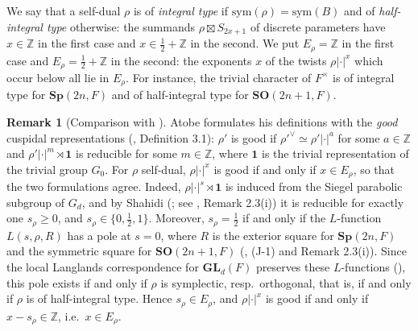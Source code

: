 \documentclass[a4paper,12pt,leqno]{amsart}
\theoremstyle{plain}
\theoremstyle{definition}
\newtheorem{rmk}[thm]{Remark}
\providecommand{\bbZ}{\mathbb{Z}}\providecommand{\bbC}{\mathbb{C}}\providecommand{\Id}{\mathrm{Id}}\providecommand{\Irr}{\mathbf{Irr}}\providecommand{\Alg}{\mathrm{Alg}}
\begin{document}
We say that a self-dual $\rho$ is of \emph{integral type} if $\mathrm{sym}(\rho)=\mathrm{sym}(B)$ and of
\emph{half-integral type} otherwise: the summands $\rho\boxtimes S_{2x+1}$ of discrete parameters have
$x\in\bbZ$ in the first case and $x\in\frac12+\bbZ$ in the second. We put $E_\rho=\bbZ$ in the first case and $E_\rho=\frac12+\bbZ$
in the second: the exponents $x$ of the twists $\rho|\cdot|^x$ which occur below all lie in $E_\rho$. For instance, the trivial character of
$F^\times$ is of integral type for $\mathbf{Sp}(2n,F)$ and of half-integral type for
$\mathbf{SO}(2n+1,F)$.

\begin{rmk}[Comparison with \cite{Ato24}]\label{rmk:good} Atobe formulates his definitions with the
\emph{good} cuspidal representations (\cite{Ato24}, Definition 3.1): $\rho'$ is good if
$\rho'^\vee\simeq\rho'|\cdot|^a$ for some $a\in\bbZ$ and $\rho'|\cdot|^m\rtimes\mathbf 1$ is reducible for
some $m\in\bbZ$, where $\mathbf 1$ is the trivial representation of the trivial group $G_0$. For $\rho$
self-dual, $\rho|\cdot|^x$ is good if and only if $x\in E_\rho$, so that the two formulations agree.
Indeed, $\rho|\cdot|^s\rtimes\mathbf 1$ is induced from the Siegel parabolic subgroup of $G_d$, and by
Shahidi (\cite{Sha90}; see \cite{MT02}, Remark 2.3(i)) it is reducible for exactly one $s_\rho\geq0$,
and $s_\rho\in\{0,\frac12,1\}$. Moreover, $s_\rho=\frac12$ if and only if the $L$-function
$L(s,\rho,R)$ has a pole at $s=0$, where $R$ is the exterior square for $\mathbf{Sp}(2n,F)$ and the
symmetric square for $\mathbf{SO}(2n+1,F)$ (\cite{MT02}, (J-1) and Remark 2.3(i)). Since the local
Langlands correspondence for $\mathbf{GL}_d(F)$ preserves these $L$-functions (\cite{Hen10}), this pole
exists if and only if $\rho$ is symplectic, resp.\ orthogonal, that is, if and only if $\rho$ is of
half-integral type. Hence $s_\rho\in E_\rho$, and $\rho|\cdot|^x$ is good if and only if
$x-s_\rho\in\bbZ$, i.e.\ $x\in E_\rho$.
\end{rmk}
\end{document}
